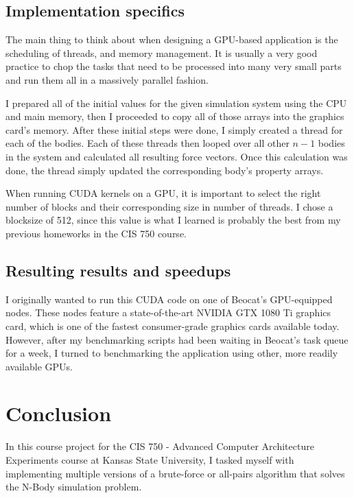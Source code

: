 \documentclass[journal]{IEEEtran}
\begin{document}
		\subsection*{Implementation specifics}
		
			The main thing to think about when designing a GPU-based application is the scheduling of threads, and memory management. It is usually a very good practice to chop the tasks that need to be processed into many very small parts and run them all in a massively parallel fashion.
			
			I prepared all of the initial values for the given simulation system using the CPU and main memory, then I proceeded to copy all of those arrays into the graphics card's memory. After these initial steps were done, I simply created a thread for each of the bodies. Each of these threads then looped over all other $n-1$ bodies in the system and calculated all resulting force vectors. Once this calculation was done, the thread simply updated the corresponding body's property arrays.
			
			When running CUDA kernels on a GPU, it is important to select the right number of blocks and their corresponding size in number of threads. I chose a blocksize of 512, since this value is what I learned is probably the best from my previous homeworks in the CIS 750 course.
			
		\subsection*{Resulting results and speedups}
		
			
			I originally wanted to run this CUDA code on one of Beocat's GPU-equipped nodes. These nodes feature a state-of-the-art NVIDIA GTX 1080 Ti graphics card, which is one of the fastest consumer-grade graphics cards available today. However, after my benchmarking scripts had been waiting in Beocat's task queue for a week, I turned to benchmarking the application using other, more readily available GPUs.


	\section{Conclusion}
	
		In this course project for the CIS 750 - Advanced Computer Architecture Experiments course at Kansas State University, I tasked myself with implementing multiple versions of a brute-force or all-pairs algorithm that solves the N-Body simulation problem.
		
\end{document}
